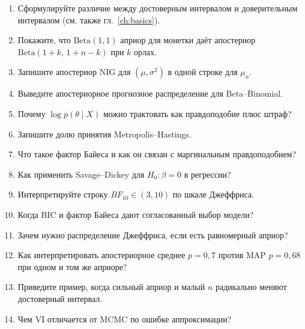 \begin{enumerate}
    \item Сформулируйте различие между достоверным интервалом и доверительным
          интервалом (см. также гл.~\ref{ch:basics}).
    \item Покажите, что $\mathrm{Beta}(1,1)$ априор для монетки даёт апостериор
          $\mathrm{Beta}(1+k,\,1+n-k)$ при $k$ орлах.
    \item Запишите апостериор NIG для $(\mu,\sigma^2)$ в одной строке
          для $\mu_n$.
    \item Выведите апостериорное прогнозное распределение для Beta--Binomial.
    \item Почему $\log p(\theta\mid X)$ можно трактовать как правдоподобие плюс штраф?
    \item Запишите долю принятия Metropolis--Hastings.
    \item Что такое фактор Байеса и как он связан с маргинальным правдоподобием?
    \item Как применить Savage--Dickey для $H_0\colon\beta=0$ в регрессии?
    \item Интерпретируйте строку $BF_{10}\in(3,10)$ по шкале Джеффриса.
    \item Когда BIC и фактор Байеса дают согласованный выбор модели?
    \item Зачем нужно распределение Джеффриса, если есть равномерный априор?
    \item Как интерпретировать апостериорное среднее $p=0{,}7$ против MAP $p=0{,}68$
          при одном и том же априоре?
    \item Приведите пример, когда сильный априор и малый $n$ радикально
          меняют достоверный интервал.
    \item Чем VI отличается от MCMC по ошибке аппроксимации?
\end{enumerate}
